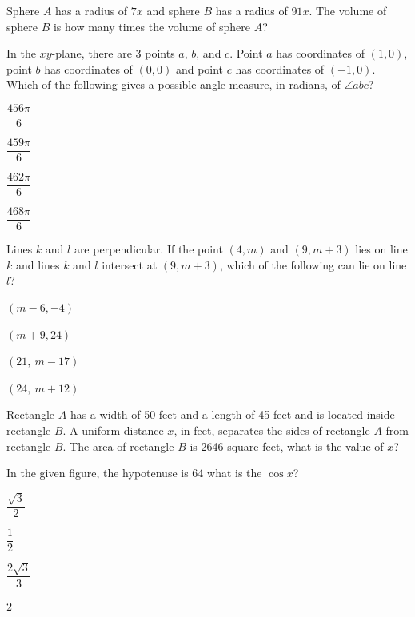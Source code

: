 \vfill
\clearpage
\noindent\begin{minipage}{\linewidth}
\par\smallskip
Sphere $A$ has a radius of $7x$ and sphere $B$ has a radius of $91x$. The volume of sphere $B$ is how many times the volume of sphere $A$?
\end{minipage}
\vfill
\noindent\begin{minipage}{\linewidth}
\par\smallskip
In the $xy$-plane, there are 3 points $a$, $b$, and $c$. Point $a$ has coordinates of $(1,0)$, point $b$ has coordinates of $(0,0)$ and point $c$ has coordinates of $(-1,0)$. Which of the following gives a possible angle measure, in radians, of $\angle abc$?
\begin{satchoices}
  \item[A)] $\dfrac{456\pi}{6}$
  \item[B)] $\dfrac{459\pi}{6}$
  \item[C)] $\dfrac{462\pi}{6}$
  \item[D)] $\dfrac{468\pi}{6}$
\end{satchoices}
\end{minipage}
\vfill
\noindent\begin{minipage}{\linewidth}
\par\smallskip
Lines $k$ and $l$ are perpendicular. If the point $(4,m)$ and $(9,m+3)$ lies on line $k$ and lines $k$ and $l$ intersect at $(9,m+3)$, which of the following can lie on line $l$?
\begin{satchoices}
  \item[A)] $(m-6,-4)$
  \item[B)] $(m+9,24)$
  \item[C)] $(21,\ m-17)$
  \item[D)] $(24,\ m+12)$
\end{satchoices}
\end{minipage}
\vfill
\clearpage
\noindent\begin{minipage}{\linewidth}
\par\smallskip
Rectangle $A$ has a width of 50 feet and a length of 45 feet and is located inside rectangle $B$. A uniform distance $x$, in feet, separates the sides of rectangle $A$ from rectangle $B$. The area of rectangle $B$ is 2646 square feet, what is the value of $x$?
\satfig{\fignestedrect}
\satnotetoscale
\end{minipage}
\vfill
\noindent\begin{minipage}{\linewidth}
\par\smallskip
In the given figure, the hypotenuse is 64 what is the $\cos x$?
\satfig{\figrighttrisixty}
\satnotetoscale
\begin{satchoices}
  \item[A)] $\dfrac{\sqrt{3}}{2}$
  \item[B)] $\dfrac{1}{2}$
  \item[C)] $\dfrac{2\sqrt{3}}{3}$
  \item[D)] $2$
\end{satchoices}
\end{minipage}
